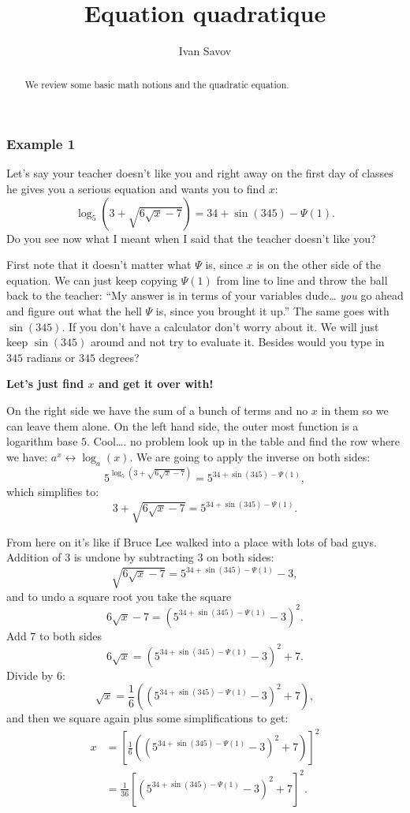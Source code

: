 \documentclass[twocolumn,8pt]{extarticle}
\title{ \Huge Equation quadratique}
\author{Ivan Savov}
\newcommand{\dokutitlelevelfour}[1]{\subsubsection{#1}}
\newcommand{\dokubold}[1]{\textbf{#1}}
\newcommand{\dokuitalic}[1]{\textsl{#1}}
\begin{document}
\maketitle


\begin{abstract}
We review some basic math notions and the 
quadratic equation.
\end{abstract}





\dokutitlelevelfour{Example 1}

Let's say your teacher doesn't like you and right away on the first day of classes he gives you 
a serious equation and wants you to find \(x\):
\[
   \log_5\left(3 + \sqrt{6\sqrt{x}-7}   \right) = 34+\sin(345)-\Psi(1).
\]
Do you see now what I meant when I said that the teacher doesn't like you?

First note that it doesn't matter what \(\Psi\) is, since \(x\) is on the other 
side of the equation. We can just keep copying \(\Psi(1)\) from line to line
and throw the ball back to the teacher: ``My answer is in terms of your variables dude\ldots{} \dokuitalic{you} go ahead and figure out what the hell \(\Psi\) is,
since you brought it up.''
The same goes with \(\sin(345)\). If you don't have a calculator don't worry about it. 
We will just keep \(\sin(345)\) around and not try to evaluate it.
Besides would you type in \(345\) radians or \(345\) degrees?


\dokubold{Let's just find \(x\) and get it over with!}

On the right side we have the sum of a bunch of terms and no \(x\) in them so we can leave them alone.
On the left hand side, the outer most function is a logarithm base \(5\). 
Cool\ldots{}. no problem look up in the table and find the 
row where we have: \(a^x \leftrightarrow \log_a(x)\).
We are going to apply the inverse on both sides:
\[
   5^{ \log_5\left(3 + \sqrt{6\sqrt{x}-7}   \right) }  = 5^{ 34+\sin(345)-\Psi(1) },
\]
which simplifies to:
\[
  3 + \sqrt{6\sqrt{x}-7} = 5^{ 34+\sin(345)-\Psi(1) }.
\]

From here on it's like if Bruce Lee walked into a place with lots of bad guys. Addition of 3 is undone by subtracting \(3\) on both sides:
\[
  \sqrt{6\sqrt{x}-7} = 5^{ 34+\sin(345)-\Psi(1) } - 3,
\]
and to undo a square root you take the square
\[
  6\sqrt{x}-7 = \left(5^{ 34+\sin(345)-\Psi(1) } - 3\right)^2.
\]
Add \(7\) to both sides
\[
  6\sqrt{x} = \left(5^{ 34+\sin(345)-\Psi(1) } - 3\right)^2+7.
\]
Divide by \(6\):
\[
  \sqrt{x} = \frac{1}{6}\left(\left(5^{ 34+\sin(345)-\Psi(1) } - 3\right)^2+7\right),
\]
and then we square again plus some simplifications to get:
\begin{align*}
  x 
 &= \left[\frac{1}{6}\left(\left(5^{ 34+\sin(345)-\Psi(1) } - 3\right)^2+7\right) \right]^2  \\
 &= \frac{1}{36}\left[\left(5^{ 34+\sin(345)-\Psi(1) } - 3\right)^2+7\right]^2.
\end{align*}
\end{document}
